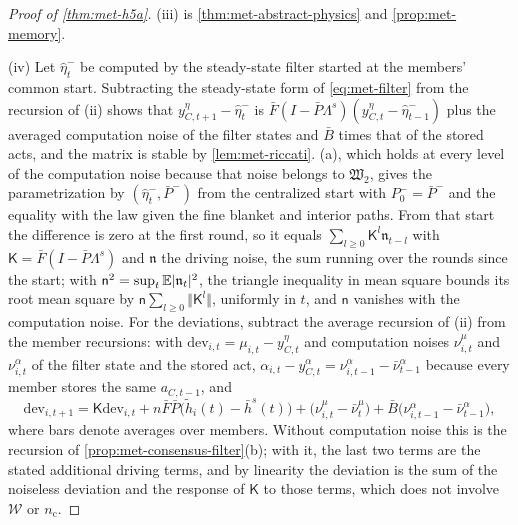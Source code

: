 \begin{proof}[Proof of \cref{thm:met-h5a}]
(iii) is \cref{thm:met-abstract-physics} and \cref{prop:met-memory}.

(iv) Let $\hat\eta^-_t$ be computed by the steady-state filter started at the members' common start. Subtracting the steady-state form of \eqref{eq:met-filter} from the recursion of (ii) shows that $y^\eta_{C,t+1}-\hat\eta^-_t$ is $\bar F(I-\bar P\Lambda^s)(y^\eta_{C,t}-\hat\eta^-_{t-1})$ plus the averaged computation noise of the filter states and $\bar B$ times that of the stored acts, and the matrix is stable by \cref{lem:met-riccati}. (a), which holds at every level of the computation noise because that noise belongs to $\mathfrak W_2$, gives the parametrization by $(\hat\eta^-_t,\bar P^-)$ from the centralized start with $P^-_0=\bar P^-$ and the equality with the law given the fine blanket and interior paths. From that start the difference is zero at the first round, so it equals $\sum_{l\ge0}\mathsf K^l\mathfrak n_{t-l}$ with $\mathsf K=\bar F(I-\bar P\Lambda^s)$ and $\mathfrak n$ the driving noise, the sum running over the rounds since the start; with $\mathsf n^2=\sup_t\mathbb{E}\lvert\mathfrak n_t\rvert^2$, the triangle inequality in mean square bounds its root mean square by $\mathsf n\sum_{l\ge0}\Vert\mathsf K^l\Vert$, uniformly in $t$, and $\mathsf n$ vanishes with the computation noise. For the deviations, subtract the average recursion of (ii) from the member recursions: with $\mathrm{dev}_{i,t}=\mu_{i,t}-y^\eta_{C,t}$ and computation noises $\nu^\mu_{i,t}$ and $\nu^\alpha_{i,t}$ of the filter state and the stored act, $\alpha_{i,t}-y^\alpha_{C,t}=\nu^\alpha_{i,t-1}-\bar\nu^\alpha_{t-1}$ because every member stores the same $a_{C,t-1}$, and
\begin{equation*}
\mathrm{dev}_{i,t+1}=\mathsf K\mathrm{dev}_{i,t}+n\bar F\bar P\bigl(\tilde h_i(t)-\bar h^s(t)\bigr)+\bigl(\nu^\mu_{i,t}-\bar\nu^\mu_t\bigr)+\bar B\bigl(\nu^\alpha_{i,t-1}-\bar\nu^\alpha_{t-1}\bigr),
\end{equation*}
where bars denote averages over members. Without computation noise this is the recursion of \cref{prop:met-consensus-filter}(b); with it, the last two terms are the stated additional driving terms, and by linearity the deviation is the sum of the noiseless deviation and the response of $\mathsf K$ to those terms, which does not involve $\mathcal W$ or $n_{\mathrm c}$.


\end{proof}
